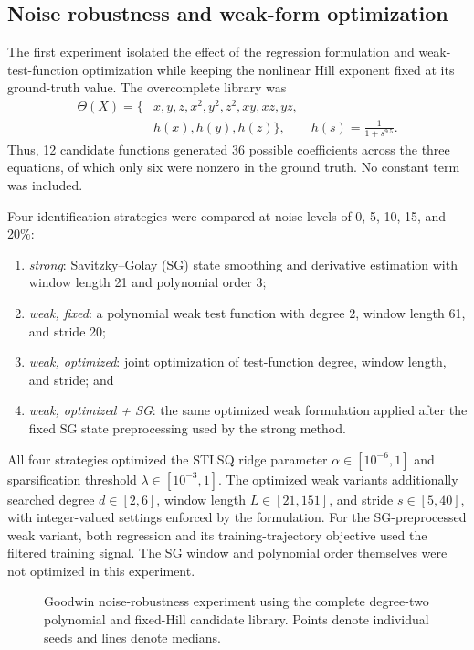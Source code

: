 \subsection{Noise robustness and weak-form optimization}
\label{sec:results-goodwin-noise}

The first experiment isolated the effect of the regression formulation and
weak-test-function optimization while keeping the nonlinear Hill exponent
fixed at its ground-truth value.  The overcomplete library was
\begin{equation}
\begin{split}
\Theta(X)=\{&x,y,z,x^2,y^2,z^2,xy,xz,yz,\\
&h(x),h(y),h(z)\},
\qquad h(s)=\frac{1}{1+s^{9.5}}.
\end{split}
\label{eq:figure2-library}
\end{equation}
Thus, 12 candidate functions generated 36 possible coefficients across the
three equations, of which only six were nonzero in the ground truth.  No
constant term was included.

Four identification strategies were compared at noise levels of 0, 5, 10, 15,
and 20\%:
\begin{enumerate}
    \item \emph{strong}: Savitzky--Golay (SG) state smoothing and derivative
    estimation with window length 21 and polynomial order 3;
    \item \emph{weak, fixed}: a polynomial weak test function with degree 2,
    window length 61, and stride 20;
    \item \emph{weak, optimized}: joint optimization of test-function degree,
    window length, and stride; and
    \item \emph{weak, optimized + SG}: the same optimized weak formulation
    applied after the fixed SG state preprocessing used by the strong method.
\end{enumerate}
All four strategies optimized the STLSQ ridge parameter
$\alpha\in[10^{-6},1]$ and sparsification threshold
$\lambda\in[10^{-3},1]$.  The optimized weak variants additionally searched
degree $d\in[2,6]$, window length $L\in[21,151]$, and stride
$s\in[5,40]$, with integer-valued settings enforced by the formulation.  For
the SG-preprocessed weak variant, both regression and its training-trajectory
objective used the filtered training signal.  The SG window and polynomial
order themselves were not optimized in this experiment.

\begin{figure}[t]
    \centering
    \caption{Goodwin noise-robustness experiment using the complete
    degree-two polynomial and fixed-Hill candidate library.  Points denote
    individual seeds and lines denote medians.}
    \label{fig:goodwin-noise-robustness}
\end{figure}

